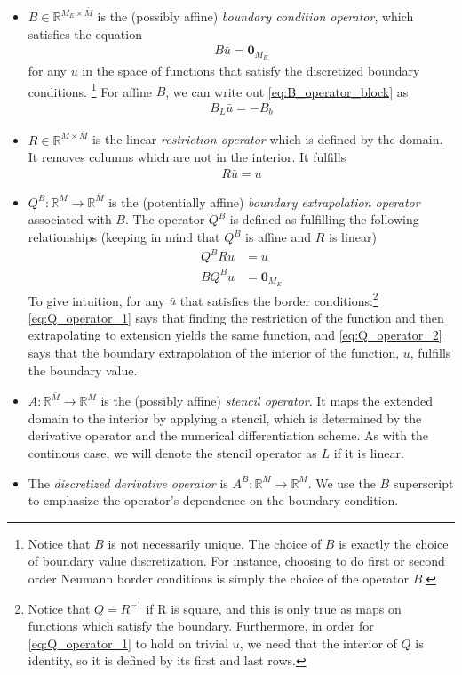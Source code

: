 \documentclass[11pt]{article}
\newcommand{\R}{\ensuremath{\mathbb{R}}}
\begin{document}
\begin{itemize}
	\item $B\in \R^{M_E \times \bar{M}}$ is the (possibly affine) \textit{boundary condition operator}, which satisfies the equation
	\begin{align}
		B \bar{u} = \mathbf{0}_{M_E}\label{eq:B_operator_block}
	\end{align}
	for any $\bar{u}$ in the space of functions that satisfy the discretized boundary conditions. \footnote{Notice that $B$ is not necessarily unique. The choice of $B$ is exactly the choice of boundary value discretization. For instance, choosing to do first or second order Neumann border conditions is simply the choice of the operator $B$.} For affine $B$, we can write out \cref{eq:B_operator_block} as
	\begin{align}
		B_L\bar{u} = -B_b\label{eq:B_operator_block_expanded}
	\end{align}
	\item $R\in \R^{M\times \bar{M}}$ is the linear \textit{restriction operator} which is defined by the domain. It removes columns which are not in the interior. It fulfills
	\begin{align}
		R \bar{u} = u \label{eq:R_operator}
	\end{align}

	\item $Q^B : \R^M \to \R^{\bar{M}}$ is the (potentially affine) \textit{boundary extrapolation operator} associated with $B$. The operator $Q^B$ is defined as fulfilling the following relationships (keeping in mind that $Q^B$ is affine and $R$ is linear)
	\begin{align}
		Q^B  R\bar{u} &= \bar{u}\label{eq:Q_operator_1}\\
		B Q^B u &= \mathbf{0}_{M_E}	\label{eq:Q_operator_2}
	\end{align}
	To give intuition, for any $\bar{u}$ that satisfies the border conditions:\footnote{Notice that $Q = R^{-1}$ if R is square, and this is only true as maps on functions which satisfy the boundary.  Furthermore, in order for \cref{eq:Q_operator_1} to hold on trivial $u$, we need that the interior of $Q$ is identity, so it is defined by its first and last rows.} \cref{eq:Q_operator_1} says that finding the restriction of the function and then extrapolating to extension yields the same function, and \cref{eq:Q_operator_2} says that the boundary extrapolation of the interior of the function, $u$, fulfills the boundary value.
	\item $A : \R^{\bar{M}} \to \R^M$ is the (possibly affine) \textit{stencil operator}. It maps the extended domain to the interior by applying a stencil, which is determined by the derivative operator and the numerical differentiation scheme. As with the continous case, we will denote the stencil operator as $L$ if it is linear.
	\item The \textit{discretized derivative operator} is $A^B : \R^M \to \R^M$. We use the $B$ superscript to emphasize the operator's dependence on the boundary condition.
	

\end{itemize}
\end{document}
